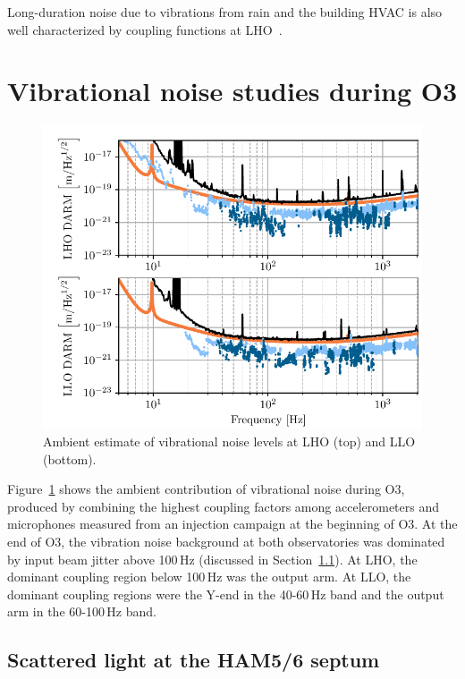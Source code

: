 Long-duration noise due to vibrations from rain and the building \ac{HVAC} is also well characterized by coupling functions at \ac{LHO}~\citep{alog_rain, alog_hvac_coupling}.

\section{Vibrational noise studies during O3}\label{sec:noise-vib}

\begin{figure}[h!]
	\centering
	\includegraphics[width=\textwidth]{figures/noise-ambient-vib.pdf}
	\caption{
		Ambient estimate of vibrational noise levels at LHO (top) and LLO (bottom).}
	\label{fig:noise_ambient_vib}
\end{figure}

Figure~\ref{fig:noise_ambient_vib} shows the ambient contribution of vibrational noise during \ac{O3}, produced by combining the highest coupling factors among accelerometers and microphones measured from an injection campaign at the beginning of \ac{O3}.
At the end of \ac{O3}, the vibration noise background at both observatories was dominated by input beam jitter above 100\,Hz (discussed in Section~\ref{sec:noise-vib-septum}).
At \ac{LHO},  the dominant coupling region below 100\,Hz was the output arm.
At \ac{LLO}, the dominant coupling regions were the Y-end in the 40-60\,Hz band and the output arm in the 60-100\,Hz band.

\subsection{Scattered light at the HAM5/6 septum}\label{sec:noise-vib-septum}

